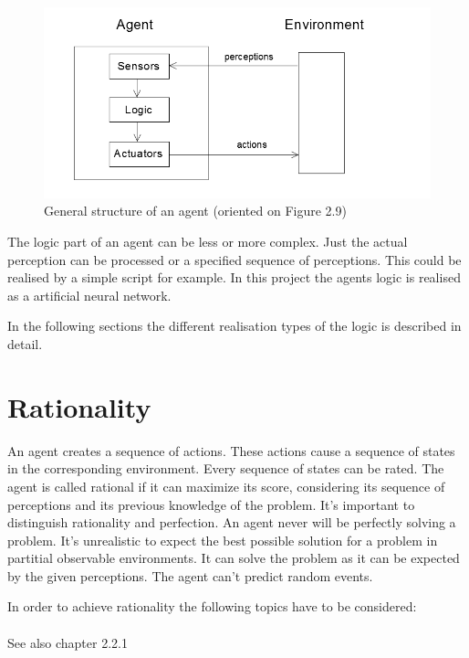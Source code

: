 \documentclass[10pt,a4paper,DIV=11]{scrreprt}
\begin{document}
\begin{center}
	\begin{figure}[H]
		\centering
		\includegraphics[width=1.0\textwidth,scale=1]{files/agent.png}  
		\caption{General structure of an agent (oriented on \cite{ai} Figure 2.9)} 
		\label{fig:agent}
	\end{figure}
\end{center}

The logic part of an agent can be less or more complex. Just the actual perception can be processed or a specified sequence of perceptions. This could be realised by a simple script for example.
In this project the agents logic is realised as a artificial neural network.

In the following sections the different realisation types of the logic is described in detail.


\section{Rationality}
An agent creates a sequence of actions. These actions cause a sequence of states in the corresponding environment. Every sequence of states can be rated. The agent is called rational if it can maximize its score, considering its sequence of perceptions and its previous knowledge of the problem.\cite{ai} It's important to distinguish rationality and perfection. An agent never will be perfectly solving a problem. It's unrealistic to expect the best possible solution for a problem in partitial observable environments. It can solve the problem as it can be expected by the given perceptions. The agent can't predict random events.

In order to achieve rationality the following topics have to be considered: \\

   \\
See also \cite{ai} chapter 2.2.1
\end{document}
